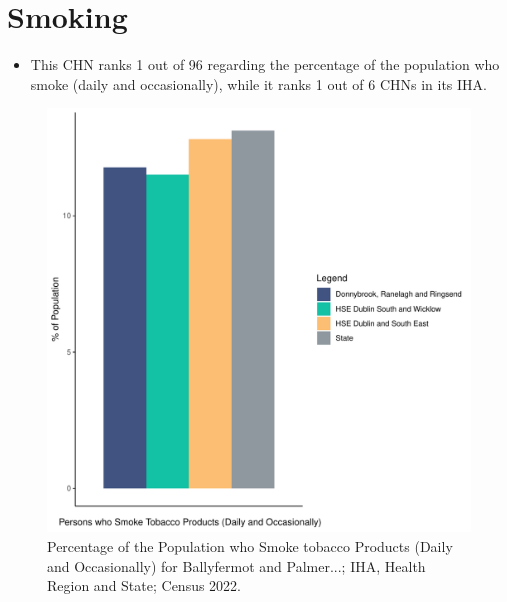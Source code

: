 \documentclass{article}
\begin{document}
\pagebreak

\section{Smoking}\label{sect:Smoking}
\begin{itemize}
\item This CHN ranks  1 out of 96 regarding the percentage of the population who smoke (daily and occasionally), while it ranks   1 out of 6 CHNs in its IHA.
\end{itemize}
\begin{figure}[H]
	\centering
	\includegraphics[width = 120mm]{../figures/SmokingED.pdf}
	\caption{Percentage of the Population who Smoke tobacco Products (Daily and Occasionally) for Ballyfermot and Palmer...; IHA, Health Region and State; Census 2022.}
	\label{fig:2ae19629-1a6a-13a3-e055-000000000001}
	\end{figure}
	
\end{document}
